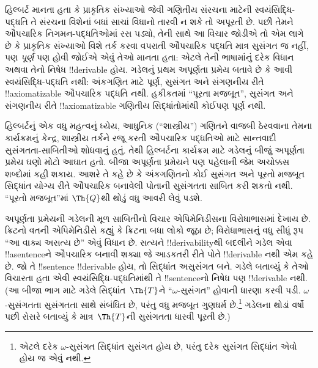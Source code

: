 \documentclass[../../../include/open-logic-section]{subfiles}
\begin{document}


હિલ્બર્ટ માનતા હતા કે
પ્રાકૃતિક સંખ્યાઓ જેવી
ગણિતીય સંરચના માટેની
સ્વયંસિદ્ધિ-પદ્ધતિ તે
સંરચના વિશેનાં બધાં સાચાં
વિધાનો તારવી ન શકે તો
અપૂરતી છે. પછી તેમને
ઔપચારિક નિગમન-પદ્ધતિઓમાં
રસ પડ્યો, તેની સાથે આ
વિચાર જોડીએ તો એમ લાગે
છે કે પ્રાકૃતિક સંખ્યાઓ
વિશે તર્ક કરવા વપરાતી
ઔપચારિક પદ્ધતિ માત્ર
સુસંગત જ નહીં, પણ
\emph{પૂર્ણ} પણ હોવી જોઈએ
એવું તેઓ માનતા હતા:
એટલે તેની ભાષામાંનું દરેક
વિધાન અથવા તેનો નિષેધ
!!{derivable} હોય.
ગડેલનું પ્રથમ અપૂર્ણતા
પ્રમેય બતાવે છે કે આવી
સ્વયંસિદ્ધિ-પદ્ધતિ નથી:
અંકગણિત માટે પૂર્ણ,
સુસંગત અને સંગણનીય રીતે
!!{axiomatizable}
ઔપચારિક પદ્ધતિ નથી.
હકીકતમાં ``પૂરતા મજબૂત'',
સુસંગત અને સંગણનીય રીતે
!!{axiomatizable}
ગણિતીય સિદ્ધાંતોમાંથી
કોઈપણ પૂર્ણ નથી.

હિલ્બર્ટનું એક વધુ મહત્વનું
ધ્યેય, આધુનિક
(``શાસ્ત્રીય'') ગણિતને
વાજબી ઠેરવવાના તેમના
કાર્યક્રમનું કેન્દ્ર, શાસ્ત્રીય
તર્કને રજૂ કરતી ઔપચારિક
પદ્ધતિઓ માટે સાન્તવાદી
સુસંગતતા-સાબિતીઓ શોધવાનું
હતું. તેથી હિલ્બર્ટના
કાર્યક્રમ માટે ગડેલનું
બીજું અપૂર્ણતા પ્રમેય
ઘણો મોટો આઘાત હતો.
બીજા અપૂર્ણતા પ્રમેયને પણ
પહેલાની જેમ અચોક્કસ
શબ્દોમાં કહી શકાય.
આશરે તે કહે છે કે
અંકગણિતનો કોઈ સુસંગત અને પૂરતો
મજબૂત સિદ્ધાંત
યોગ્ય રીતે ઔપચારિક બનાવેલી પોતાની સુસંગતતા સાબિત કરી
શકતો નથી. ``પૂરતો
મજબૂત''માં $\Th{Q}$થી
થોડું વધુ આવરી લેવું
પડશે.

અપૂર્ણતા પ્રમેયની ગડેલની
મૂળ સાબિતીનો વિચાર
એપિમેનિડીસના વિરોધાભાસમાં
દેખાય છે. ક્રિટનો વતની
એપિમેનિડીસે કહ્યું કે
ક્રિટના બધા લોકો જૂઠા છે;
વિરોધાભાસનું વધુ સીધું
રૂપ ``આ વાક્ય અસત્ય છે''
એવું વિધાન છે. સત્યને
!!{derivability}થી બદલીને
ગડેલ એવા !!a{sentence}ને
ઔપચારિક બનાવી શક્યા જે
આડકતરી રીતે પોતે
!!{derivable} નથી એમ
કહે છે. જો તે !!{sentence}
!!{derivable} હોય, તો
સિદ્ધાંત અસુસંગત બને.
ગડેલે બતાવ્યું કે તેઓ
વિચારતા હતા એવી
સ્વયંસિદ્ધિ-પદ્ધતિમાંથી
તે !!{sentence}નો નિષેધ
પણ !!{derivable} નથી.
(આ બીજા ભાગ માટે ગડેલે
સિદ્ધાંત~$\Th{T}$ને
``$\omega$-સુસંગત''
હોવાની ધારણા કરવી પડી.
$\omega$-સુસંગતતા
સુસંગતતા સાથે સંબંધિત છે,
પરંતુ વધુ મજબૂત ગુણધર્મ
છે.\footnote{એટલે દરેક
$\omega$-સુસંગત સિદ્ધાંત
સુસંગત હોય છે, પરંતુ
દરેક સુસંગત સિદ્ધાંત
એવો હોય જ એવું
નથી.} ગડેલના થોડાં વર્ષો
પછી રોસરે બતાવ્યું કે
માત્ર~$\Th{T}$ની
સુસંગતતા ધારવી પૂરતી છે.)
\end{document}

